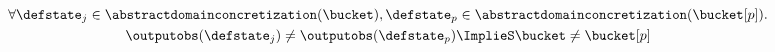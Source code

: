 \begin{gather*}
\forall
\defstate_j \in \abstractdomainconcretization(\bucket), \defstate_p \in \abstractdomainconcretization(\bucket[p]). \\
{\outputobs(\defstate_j) \neq \outputobs(\defstate_p)} \ImplieS \bucket \neq \bucket[p]
\end{gather*}
